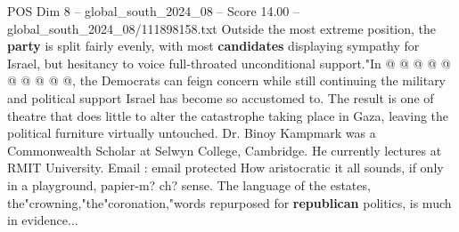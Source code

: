 \begin{textsample}{POS Dim 8 – global\_south\_2024\_08 – Score 14.00 – global\_south\_2024\_08/111898158.txt}
Outside the most extreme position, the \textbf{party} is split fairly evenly, with most \textbf{candidates} displaying sympathy for Israel, but hesitancy to voice full-throated unconditional support."In @ @ @ @ @ @ @ @ @ @, the Democrats can feign concern while still continuing the military and political support Israel has become so accustomed to.
The result is one of theatre that does little to alter the catastrophe taking place in Gaza, leaving the political furniture virtually untouched.
Dr.
Binoy Kampmark was a Commonwealth Scholar at Selwyn College, Cambridge.
He currently lectures at RMIT University.
Email : email protected How aristocratic it all sounds, if only in a playground, papier-m? ch? sense.
The language of the estates, the"crowning,"the"coronation,"words repurposed for \textbf{republican} politics, is much in evidence...

\end{textsample}
